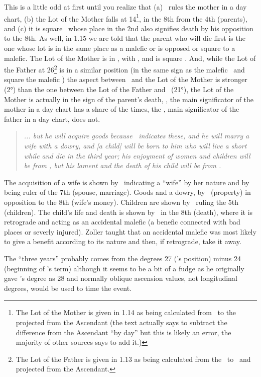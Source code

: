 This is a little odd at first until you realize that (a) \Venus\, rules the mother in a day chart, (b) the Lot of the Mother falls at 14\Virgo\footnote{The Lot of the Mother is given in 1.14 as being calculated from \Venus\, to the \Moon\, projected from the Ascendant (the text actually says to subtract the difference from the Ascendant ``by day'' but this is likely an error, the majority of other sources says to add it.)}, in the 8th from the 4th (parents), and (c) it is square \Saturn\, whose place in the 2nd also signifies death by his opposition to the 8th. As well, in 1.15 we are told that the parent who will die first is the one whose lot is in the same place as a malefic or is opposed or square to a malefic. The Lot of the Mother is in \Virgo, with \Mars, and is square \Saturn. And, while the Lot of the Father at 26\Sagittarius\footnote{The Lot of the Father is given in 1.13 as being calculated from the \Sun\, to \Saturn\, and projected from the Ascendant.} is in a similar position (in the same sign as the malefic \Saturn\, and square the malefic \Mars) the aspect between \Saturn\, and the Lot of the Mother is stronger (2°) than the one between the Lot of the Father and \Mars\, (21°), the Lot of the Mother is actually in the sign of the parent's death, \Venus, the main significator of the mother in a day chart has a share of the times, the \Sun, main significator of the father in a day chart, does not.

\begin{quote}
\textsl{... but he will acquire goods because \Saturn\, indicates these, and he will marry a wife with a dowry, and [a child] will be born to him who will live a short while and die in the third year; his enjoyment of women and children will be from \Venus, but his lament and the death of his child will be from \Saturn.}
\end{quote}

The acquisition of a wife is shown by \Venus\, indicating a ``wife'' by her nature and by being ruler of the 7th (spouse, marriage). Goods and a dowry, by \Saturn\, (property) in opposition to the 8th (wife's money). Children are shown by \Jupiter\, ruling the 5th (children). The child's life and death is shown by \Jupiter\, in the 8th (death), where it is retrograde and acting as an accidental malefic (a benefic connected with bad places or severly injured).  Zoller taught that an accidental malefic was most likely to give a benefit according to its nature and then, if retrograde, take it away. 

The ``three years'' probably comes from the degrees 27 (\Venus's position) minus 24 (beginning of \Saturn's term) although it seems to be a bit of a fudge as he originally gave \Venus's degree as 28 and normally oblique ascension values, not longitudinal degrees, would be used to time the event.

